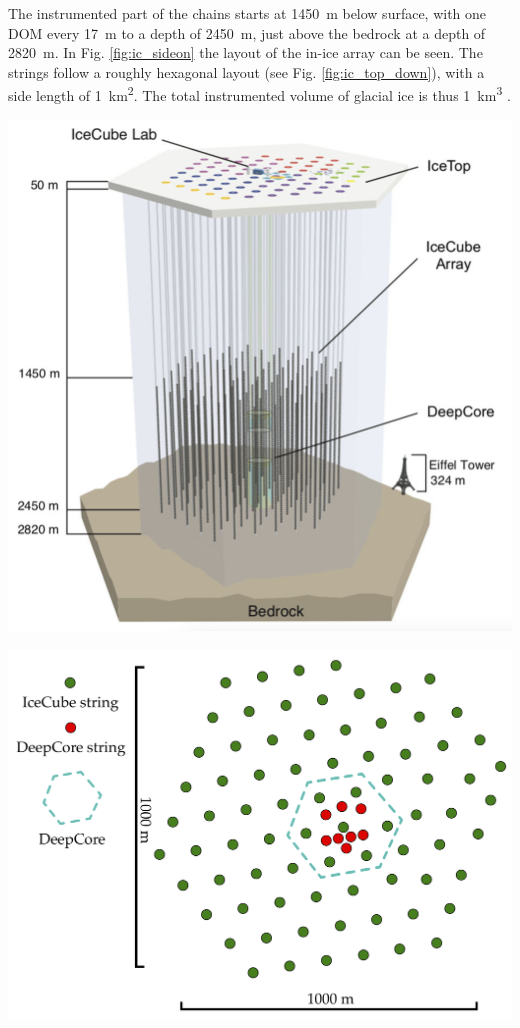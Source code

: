 \documentclass[
    a4paper, %
    fontsize=10pt, %
    twoside=true, %
    numbers=noenddot, %
    fontmethod=tex, %
]{kaobook}
\begin{document}
The instrumented part of the chains starts at \SI{1450}{\m} below surface, with one DOM every \SI{17}{\m} to a depth of \SI{2450}{\m}, just above the bedrock at a depth of \SI{2820}{\m}. In Fig. \ref{fig:ic_sideon} the layout of the in-ice array can be seen. The strings follow a roughly hexagonal layout (see Fig. \ref{fig:ic_top_down}), with a side length of \SI{1}{\km\squared}. The total instrumented volume of glacial ice is thus \SI{1}{\km\cubed} \cite{Aartsen2017}.
\begin{marginfigure}
    \includegraphics{ic_side_view.png}
    \caption[IceCube side-on]{Side view of the IceCube detector, showing the instrumented array deep in the antarctic glacial ice. In the center on top is the IceCube Laboratory, were data acquisition takes place. From \cite{Ahlers2018a}.}
\end{marginfigure}
\begin{marginfigure}
    \includegraphics{ic_top_view.pdf}
    \caption[IceCube top-down view]{Top-down view of the IceCube detector, spanning \SI{1}{\square\km} on the surface. Adopted from \cite{Ahlers2018a}.}
\end{marginfigure}
\end{document}
